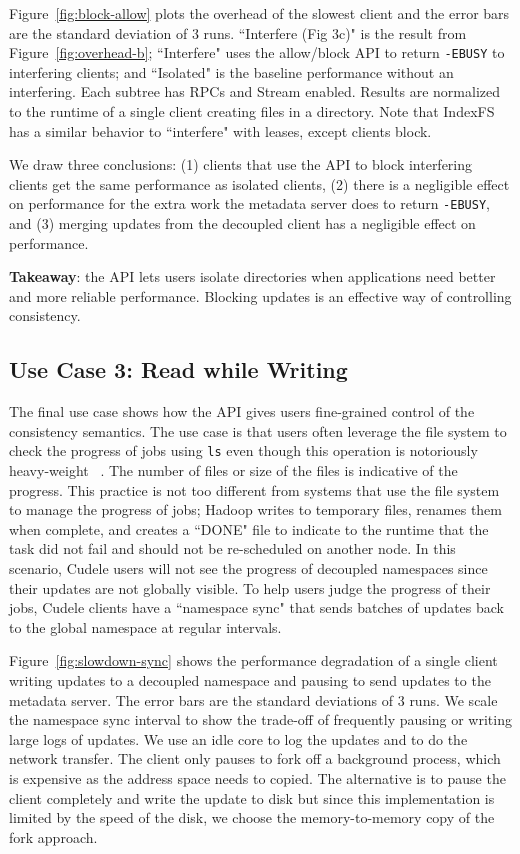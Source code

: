 Figure~\ref{fig:block-allow} plots the overhead of the slowest client and the
error bars are the standard deviation of 3 runs.  ``Interfere (Fig 3c)" is the
result from Figure~\ref{fig:overhead-b}; ``Interfere" uses the allow/block API
to return \texttt{-EBUSY} to interfering clients; and ``Isolated" is the
baseline performance without an interfering. Each subtree has RPCs and
Stream enabled.  Results are normalized to the runtime of a single
client creating files in a directory. Note that IndexFS has a similar behavior
to ``interfere" with leases, except clients block. 

We draw three conclusions: (1) clients that use the API to block interfering
clients  get the same performance as isolated clients, (2) there is a
negligible effect on performance for the extra work the metadata server does to
return \texttt{-EBUSY}, and (3) merging updates from the decoupled client has a
negligible effect on performance.

\textbf{Takeaway}: the API lets users isolate directories when applications
need better and more reliable performance. Blocking updates is an effective way of
controlling consistency.

\subsection{Use Case 3: Read while Writing}

The final use case shows how the API gives users fine-grained control of the
consistency semantics.  The use case is that users often leverage the file
system to check the progress of jobs using \texttt{ls} even though this
operation is notoriously heavy-weight~\cite{carns:ipdps09-pvfs,
eshel:fast10-panache} . The number of files or size of the files is indicative
of the progress. This practice is not too different from systems that use the
file system to manage the progress of jobs; Hadoop writes to temporary files,
renames them when complete, and creates a ``DONE" file to indicate to the
runtime that the task did not fail and should not be re-scheduled on another
node. In this scenario, Cudele users will not see the progress of decoupled
namespaces since their updates are not globally visible.  To help users
judge the progress of their jobs, Cudele clients have a ``namespace sync" that
sends batches of updates back to the global namespace at regular intervals.

Figure~\ref{fig:slowdown-sync} shows the performance degradation of a single
client writing updates to a decoupled namespace and pausing to send updates to
the metadata server. The error bars are the standard deviations of 3 runs. We
scale the namespace sync interval to show the trade-off of frequently pausing
or writing large logs of updates.  We use an idle core to log the updates and
to do the network transfer. The client only pauses to fork off a background
process, which is expensive as the address space needs to copied. The
alternative is to pause the client completely and write the update to disk but
since this implementation is limited by the speed of the disk, we choose the
memory-to-memory copy of the fork approach.

